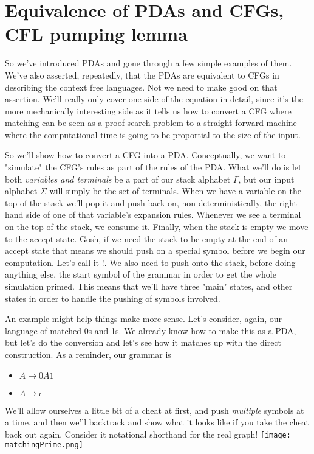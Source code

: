 \documentclass[11pt]{article}
\begin{document}
\section{Equivalence of PDAs and CFGs, CFL pumping lemma}
\label{sec-9}
So we've introduced PDAs and gone through a few simple examples of them. We've also asserted, repeatedly, that the PDAs are equivalent to CFGs in describing the context free languages. Not we need to make good on that assertion. We'll really only cover one side of the equation in detail, since it's the more mechanically interesting side as it tells us how to convert a CFG where matching can be seen as a proof search problem to a straight forward machine where the computational time is going to be proportial to the size of the input. 

So we'll show how to convert a CFG into a PDA. Conceptually, we want to "simulate" the CFG's rules as part of the rules of the PDA. What we'll do is let both \emph{variables and terminals} be a part of our stack alphabet $\Gamma$, but our input alphabet $\Sigma$ will simply be the set of terminals. When we have a variable on the top of the stack we'll pop it and push back on, non-deterministically, the right hand side of one of that variable's expansion rules. Whenever we see a terminal on the top of the stack, we consume it. Finally, when the stack is empty we move to the accept state. Gosh, if we need the stack to be empty at the end of an accept state that means we should push on a special symbol before we begin our computation. Let's call it $!$. We also need to push onto the stack, before doing anything else, the start symbol of the grammar in order to get the whole simulation primed. This means that we'll have three "main" states, and other states in order to handle the pushing of symbols involved. 

An example might help things make more sense. Let's consider, again, our language of matched 0s and 1s. We already know how to make this as a PDA, but let's do the conversion and let's see how it matches up with the direct construction. As a reminder, our grammar is 

\begin{itemize}
\item $A \to 0A1$
\item $A \to \epsilon$
\end{itemize}

We'll allow ourselves a little bit of a cheat at first, and push \emph{multiple} symbols at a time, and then we'll backtrack and show what it looks like if you take the cheat back out again. Consider it notational shorthand for the real graph!
\texttt{[image: matchingPrime.png]}
\end{document}
